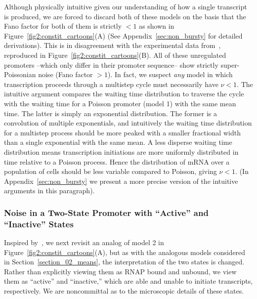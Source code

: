 Although physically intuitive given our understanding of how a single transcript
is produced, we are forced to discard both of these models on the basis that the
Fano factor for both of them is strictly $< 1$ as shown in
Figure~\ref{fig2:constit_cartoons}(A) (See Appendix~\ref{sec:non_bursty} for
detailed derivations). This is in disagreement with the experimental data
from~\cite{Jones2014}, reproduced in Figure~\ref{fig2:constit_cartoons}(B). All
of these unregulated promoters --which only differ in their promoter sequence--
show strictly super-Poissonian noise (Fano factor $> 1$). In fact, we suspect
\textit{any} model in which transcription proceeds through a multistep cycle
must necessarily have $\nu<1$. The intuitive argument compares the waiting time
distribution to traverse the cycle with the waiting time for a Poisson promoter
(model 1) with the same mean time. The latter is simply an exponential
distribution. The former is a convolution of multiple exponentials, and
intuitively the waiting time distribution for a multistep process should be more
peaked with a smaller fractional width than a single exponential with the same
mean. A less disperse waiting time distribution means transcription initiations
are more uniformly distributed in time relative to a Poisson process. Hence the
distribution of mRNA over a population of cells should be less variable compared
to Poisson, giving $\nu<1$. (In Appendix~\ref{sec:non_bursty} we present a more
precise version of the intuitive arguments in this paragraph).




  




\subsubsection{Noise in a Two-State Promoter with ``Active'' and ``Inactive''
States}

Inspired by~\cite{Razo-Mejia2020}, we next revisit an analog of model 2 in
Figure~\ref{fig2:constit_cartoons}(A), but as with
the analogous models considered in Section~\ref{section_02_means},
the interpretation of the two
states is changed. Rather than explicitly viewing them as RNAP bound and
unbound, we view them as ``active'' and ``inactive,'' which are able and unable
to initiate transcripts, respectively. We are noncommittal as to the microscopic
details of these states.

